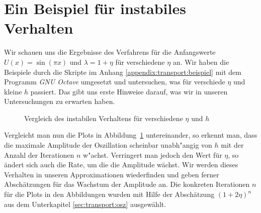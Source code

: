 \section{Ein Beispiel für instabiles Verhalten}\label{sec:transport:beispiel}

Wir schauen uns die Ergebnisse des Verfahrens für die Anfangswerte $U(x) = \sin(\pi x)$ und $\lambda = 1 + \eta$ für verschiedene $\eta$ an.
Wir haben die Beispiele durch die Skripte im Anhang \ref{appendix:transport:beispiel} mit dem Programm \emph{GNU Octave} umgesetzt und untersuchen, was für verschiede $\eta$ und kleine $h$ passiert.
Das gibt uns erste Hinweise darauf, was wir in unseren Untersuchungen zu erwarten haben.

\begin{figure}
\centering
{}
\caption{Vergleich des instabilen Verhaltens für verschiedene $\eta$ und $h$}
\label{fig:transport:beispiel}
\end{figure}


Vergleicht man nun die Plots in Abbildung~\ref{fig:transport:beispiel} untereinander, so erkennt man, dass die maximale Amplitude der Oszillation scheinbar unabh"angig von $h$ mit der Anzahl der Iterationen $n$ w"achst.
Verringert man jedoch den Wert für $\eta$, so ändert sich auch die Rate, um die die Amplitude wächst.
Wir werden dieses Verhalten in unseren Approximationen wiederfinden und geben ferner Abschätzungen für das Wachstum der Amplitude an.
Die konkreten Iterationen $n$ für die Plots in den Abbildungen wurden mit Hilfe der Abschätzung $(1 + 2 \eta)^n$ aus dem Unterkapitel \ref{sec:transport:osz} ausgewählt.


